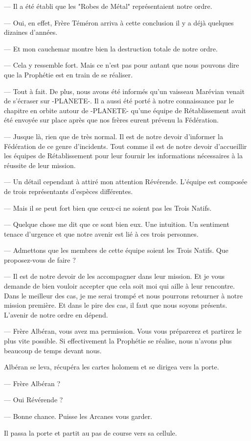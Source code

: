 \documentclass[ebook,12pt,oneside,onecolumn,openright,draft]{memoir}
\begin{document}
--- Il a été établi que les "Robes de Métal" représentaient notre ordre.

--- Oui, en effet, Frère Téméron arriva à cette conclusion il y a déjà quelques
dizaines d'années.

--- Et mon cauchemar montre bien la destruction totale de notre ordre.

--- Cela y ressemble fort. Mais ce n'est pas pour autant que nous pouvons dire
que la Prophétie est en train de se réaliser.

--- Tout à fait. De plus, nous avons été informés qu'un vaisseau Marévian venait
de s'écraser sur -PLANETE-. Il a aussi été porté à notre connaissance
par le chapitre en orbite autour de -PLANETE- qu'une équipe de Rétablissement
avait été envoyée sur place après que nos frères eurent prévenu la Fédération.

--- Jusque là, rien que de très normal. Il est de notre devoir d'informer la
Fédération de ce genre d'incidents. Tout comme il est de notre devoir
d'accueillir les équipes de Rétablissement pour leur fournir les informations
nécessaires à la réussite de leur mission.

--- Un détail cependant à attiré mon attention Révérende. L'équipe est composée
de trois représentants d'espèces différentes.

--- Mais il se peut fort bien que ceux-ci ne soient pas les Trois Natifs.

--- Quelque chose me dit que ce sont bien eux. Une intuition. Un sentiment
tenace d'urgence et que notre avenir est lié à ces trois personnes.

--- Admettons que les membres de cette équipe soient les Trois Natifs. Que
proposez-vous de faire ?

--- Il est de notre devoir de les accompagner dans leur mission. Et je vous
demande de bien vouloir accepter que cela soit moi qui aille à leur rencontre.
Dans le meilleur des cas, je me serai trompé et nous pourrons retourner à notre
mission première. Et dans le pire des cas, il faut que nous soyons présents.
L'avenir de notre ordre en dépend.

--- Frère Albéran, vous avez ma permission. Vous vous préparerez et partirez le
plus vite possible. Si effectivement la Prophétie se réalise, nous n'avons plus
beaucoup de temps devant nous.

Albéran se leva, récupéra les cartes holomem et se dirigea vers la porte.

--- Frère Albéran ?

--- Oui Révérende ?

--- Bonne chance. Puisse les Arcanes vous garder.

Il passa la porte et partit au pas de course vers sa cellule.
\end{document}
